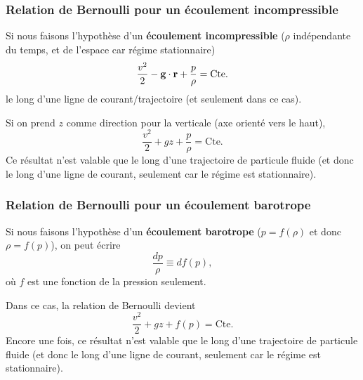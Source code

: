 \documentclass[11pt,a4paper]{report}
\begin{document}
\subsubsection{Relation de Bernoulli pour un écoulement incompressible}

Si nous faisons l'hypothèse d'un \textbf{écoulement incompressible} ($\rho$ indépendante du temps, et de l'espace car régime stationnaire) 
\begin{equation}
	\frac{v^2}{2} -\bold{g}\cdot\bold{r} + \frac{p}{\rho} = \text{Cte}.
\end{equation}
le long d'une ligne de courant/trajectoire (et seulement dans ce cas).

Si on prend $z$ comme direction pour la verticale (axe orienté vers le haut),
\begin{equation}
	\frac{v^2}{2} + gz + \frac{p}{\rho} = \text{Cte}.
\end{equation}
Ce résultat n'est valable que le long d'une trajectoire de particule fluide (et donc le long d'une ligne de courant, seulement car le régime est stationnaire).
 
\subsubsection{Relation de Bernoulli pour un écoulement barotrope}

Si nous faisons l'hypothèse d'un \textbf{écoulement barotrope} ($p = f(\rho)$ et donc $\rho = f(p)$),
on peut écrire 
\begin{equation}
	\frac{dp}{\rho} \equiv df(p),
\end{equation}
où $f$ est une fonction de la pression seulement.

Dans ce cas, la relation de Bernoulli devient
\begin{equation}
	\frac{v^2}{2} + gz + f(p) = \text{Cte}.
\end{equation}
Encore une fois, ce résultat n'est valable que le long d'une trajectoire de particule fluide (et donc le long d'une ligne de courant, seulement car le régime est stationnaire).\\
\end{document}
